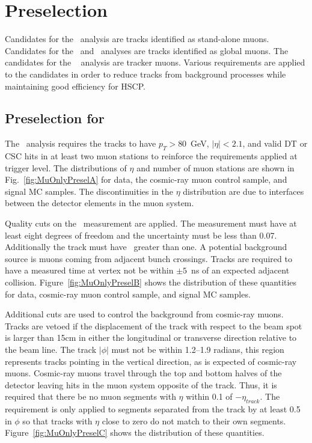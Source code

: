 \section{Preselection \label{sec:preselection}}
Candidates for the \muononly\ analysis are tracks identified as stand-alone muons. Candidates for the \tktof\ and \multi\ analyses are tracks identified
as global muons. The candidates for the \tkonly\
analysis are tracker muons.
Various requirements are applied to the candidates in order to reduce tracks from background processes while maintaining good efficiency for HSCP.

\subsection{Preselection for \muononly\ \label{sec:muonlypreselection}}

The \muononly\ analysis requires the tracks to have $p_T > 80$~GeV, $|\eta| < 2.1$, and valid DT or CSC hits in at least two muon stations
to reinforce the requirements applied at trigger level. 
The distributions of $\eta$ and number of muon stations are shown in Fig.~\ref{fig:MuOnlyPreselA} for data, the cosmic-ray muon control sample, and signal MC samples.
The discontinuities in the $\eta$ distribution are due to interfaces between the detector elements in the muon system.

Quality cuts on the \invbeta\ measurement are applied. The measurement must have at least eight degrees of freedom and the uncertainty must be less than 0.07.
Additionally the track must have \invbeta\ greater than one.
A potential background source is muons coming from adjacent bunch crossings.
Tracks are required to have a measured time at vertex not be within $\pm5$~ns of an expected adjacent collision.
Figure~\ref{fig:MuOnlyPreselB} shows the distribution of these quantities for data, cosmic-ray muon control sample, and signal MC samples.

Additional cuts are used to control the background from cosmic-ray muons. Tracks are vetoed if the displacement of the track
with respect to the beam spot is larger than 15cm in either the longitudinal or transverse direction relative to the beam line. 
The track $|\phi|$ must not be within 1.2--1.9 radians, this region represents tracks pointing in the vertical
direction, as is expected of cosmic-ray muons. Cosmic-ray muons travel 
through the top and bottom halves of the detector leaving hits in the muon system opposite of the track.
Thus, it is required that  there be no muon segments with $\eta$ within 0.1 of $-\eta_{track}$. The requirement is only applied to 
segments separated from the track by at least 0.5 in $\phi$ so that tracks with $\eta$ close to zero do not match to their own segments.
Figure~\ref{fig:MuOnlyPreselC} shows the distribution of these quantities.

